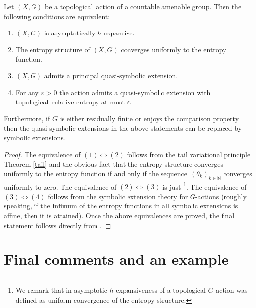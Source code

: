 \documentclass[12pt]{amsart}
\theoremstyle{definition}
\newenvironment{customthm}[1]
  {\renewcommand\theinnercustomthm{#1}\innercustomthm}
  {\endinnercustomthm}
\numberwithin{equation}{section}
\def \N {\mathbb N}
\def \sq {sequence}
\def \tl {topological}
\def \ahe {asympto\-ti\-cally $h$-ex\-pan\-sive}
\def \eps {\varepsilon}
\def \N {\mathbb N}
\def \sq {sequence}
\def \tl {topological}
\begin{document}
\begin{customthm}{2.2}
Let $(X,G)$ be a \tl\ action of a countable amenable group. Then the following conditions are equivalent:
 \begin{enumerate}
 \item $(X,G)$ is \ahe.
 \item The entropy structure of $(X,G)$ converges uniformly to the entropy function.
 \item $(X, G)$ admits a principal quasi-symbolic extension.
 \item For any $\eps>0$ the action admits a quasi-symbolic extension with \tl\ relative 
 entropy at most $\eps$.
 \end{enumerate}
Furthermore, if $G$ is either residually finite or enjoys the comparison property then the quasi-symbolic extensions in the above statements can be replaced by symbolic extensions.
\end{customthm}

\begin{proof}
The equivalence of $(1)\Longleftrightarrow (2)$ follows from the tail variational principle Theorem \ref{tail} and the obvious fact that the entropy structure converges uniformly to the entropy function if and only if the \sq\ $(\theta_k)_{k\in\N}$ converges uniformly to zero. The equivalence of $(2)\Longleftrightarrow (3)$ is just \cite[Theorem 5.6]{DownarowiczZhang}\footnote{We remark that in \cite{DownarowiczZhang} asymptotic $h$-expansiveness of a topological $G$-action was defined as uniform convergence of the entropy structure.}. The equivalence of $(3)\Longleftrightarrow (4)$ follows from the symbolic extension theory for $G$-actions \cite{DownarowiczZhang} (roughly speaking, if the infimum of the entropy functions in all symbolic extensions is affine, then it is attained). 
Once the above equivalences are proved, the final statement follows directly from \cite[Theorems 7.10 and 7.11]{DownarowiczZhang}.
\end{proof}
	
\section{Final comments and an example}\label{8}
\end{document}

